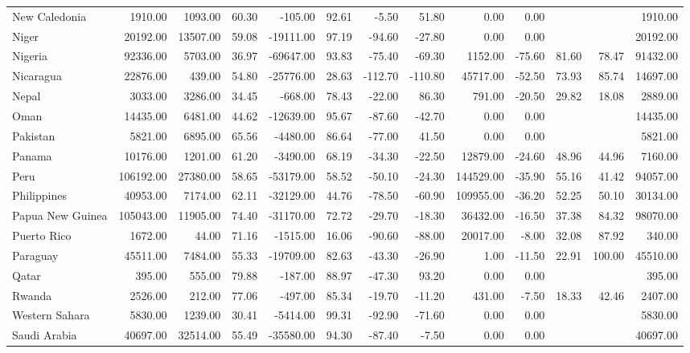 \begin{table}[ht]
\begin{tabular}{lrrrrrrrrrrrr}
  New Caledonia & 1910.00 & 1093.00 & 60.30 & -105.00 & 92.61 & -5.50 & 51.80 & 0.00 & 0.00 &  &  & 1910.00 \\ 
  Niger & 20192.00 & 13507.00 & 59.08 & -19111.00 & 97.19 & -94.60 & -27.80 & 0.00 & 0.00 &  &  & 20192.00 \\ 
  Nigeria & 92336.00 & 5703.00 & 36.97 & -69647.00 & 93.83 & -75.40 & -69.30 & 1152.00 & -75.60 & 81.60 & 78.47 & 91432.00 \\ 
  Nicaragua & 22876.00 & 439.00 & 54.80 & -25776.00 & 28.63 & -112.70 & -110.80 & 45717.00 & -52.50 & 73.93 & 85.74 & 14697.00 \\ 
  Nepal & 3033.00 & 3286.00 & 34.45 & -668.00 & 78.43 & -22.00 & 86.30 & 791.00 & -20.50 & 29.82 & 18.08 & 2889.00 \\ 
  Oman & 14435.00 & 6481.00 & 44.62 & -12639.00 & 95.67 & -87.60 & -42.70 & 0.00 & 0.00 &  &  & 14435.00 \\ 
  Pakistan & 5821.00 & 6895.00 & 65.56 & -4480.00 & 86.64 & -77.00 & 41.50 & 0.00 & 0.00 &  &  & 5821.00 \\ 
  Panama & 10176.00 & 1201.00 & 61.20 & -3490.00 & 68.19 & -34.30 & -22.50 & 12879.00 & -24.60 & 48.96 & 44.96 & 7160.00 \\ 
  Peru & 106192.00 & 27380.00 & 58.65 & -53179.00 & 58.52 & -50.10 & -24.30 & 144529.00 & -35.90 & 55.16 & 41.42 & 94057.00 \\ 
  Philippines & 40953.00 & 7174.00 & 62.11 & -32129.00 & 44.76 & -78.50 & -60.90 & 109955.00 & -36.20 & 52.25 & 50.10 & 30134.00 \\ 
  Papua New Guinea & 105043.00 & 11905.00 & 74.40 & -31170.00 & 72.72 & -29.70 & -18.30 & 36432.00 & -16.50 & 37.38 & 84.32 & 98070.00 \\ 
  Puerto Rico & 1672.00 & 44.00 & 71.16 & -1515.00 & 16.06 & -90.60 & -88.00 & 20017.00 & -8.00 & 32.08 & 87.92 & 340.00 \\ 
  Paraguay & 45511.00 & 7484.00 & 55.33 & -19709.00 & 82.63 & -43.30 & -26.90 & 1.00 & -11.50 & 22.91 & 100.00 & 45510.00 \\ 
  Qatar & 395.00 & 555.00 & 79.88 & -187.00 & 88.97 & -47.30 & 93.20 & 0.00 & 0.00 &  &  & 395.00 \\ 
  Rwanda & 2526.00 & 212.00 & 77.06 & -497.00 & 85.34 & -19.70 & -11.20 & 431.00 & -7.50 & 18.33 & 42.46 & 2407.00 \\ 
  Western Sahara & 5830.00 & 1239.00 & 30.41 & -5414.00 & 99.31 & -92.90 & -71.60 & 0.00 & 0.00 &  &  & 5830.00 \\ 
  Saudi Arabia & 40697.00 & 32514.00 & 55.49 & -35580.00 & 94.30 & -87.40 & -7.50 & 0.00 & 0.00 &  &  & 40697.00 \\ 

\end{tabular}
\end{table}
